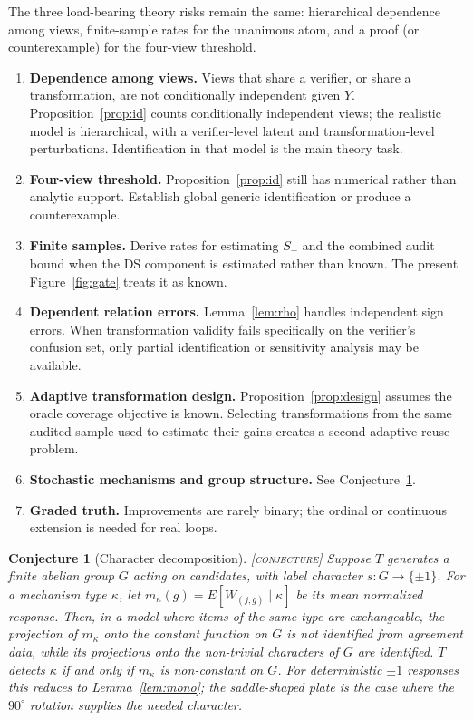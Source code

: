 \documentclass[11pt]{article}
\newtheorem{conjecture}{Conjecture}
\theoremstyle{definition}
\theoremstyle{remark}
\newcommand{\status}[1]{\hfill{\normalfont\small\textsc{[#1]}}}
\begin{document}
The three load-bearing theory risks remain the same: hierarchical dependence among views, finite-sample rates for the unanimous atom, and a proof (or counterexample) for the four-view threshold.
\begin{enumerate}
\item \textbf{Dependence among views.} Views that share a verifier, or share a transformation, are not conditionally independent given $Y$. Proposition~\ref{prop:id} counts conditionally independent views; the realistic model is hierarchical, with a verifier-level latent and transformation-level perturbations. Identification in that model is the main theory task.
\item \textbf{Four-view threshold.} Proposition~\ref{prop:id} still has numerical rather than analytic support. Establish global generic identification or produce a counterexample.
\item \textbf{Finite samples.} Derive rates for estimating $S_+$ and the combined audit bound when the DS component is estimated rather than known. The present Figure~\ref{fig:gate} treats it as known.
\item \textbf{Dependent relation errors.} Lemma~\ref{lem:rho} handles independent sign errors. When transformation validity fails specifically on the verifier's confusion set, only partial identification or sensitivity analysis may be available.
\item \textbf{Adaptive transformation design.} Proposition~\ref{prop:design} assumes the oracle coverage objective is known. Selecting transformations from the same audited sample used to estimate their gains creates a second adaptive-reuse problem.
\item \textbf{Stochastic mechanisms and group structure.} See Conjecture~\ref{conj:char}.
\item \textbf{Graded truth.} Improvements are rarely binary; the ordinal or continuous extension is needed for real loops.
\end{enumerate}

\begin{conjecture}[Character decomposition]\label{conj:char}\status{conjecture}
Suppose $T$ generates a finite abelian group $G$ acting on candidates, with label character $s:G\to\{\pm1\}$. For a mechanism type $\kappa$, let $m_\kappa(g)=E[W_{(j,g)}\mid\kappa]$ be its mean normalized response. Then, in a model where items of the same type are exchangeable, the projection of $m_\kappa$ onto the constant function on $G$ is not identified from agreement data, while its projections onto the non-trivial characters of $G$ are identified. $T$ detects $\kappa$ if and only if $m_\kappa$ is non-constant on $G$. For deterministic $\pm1$ responses this reduces to Lemma~\ref{lem:mono}; the saddle-shaped plate is the case where the $90^\circ$ rotation supplies the needed character.
\end{conjecture}
\end{document}
